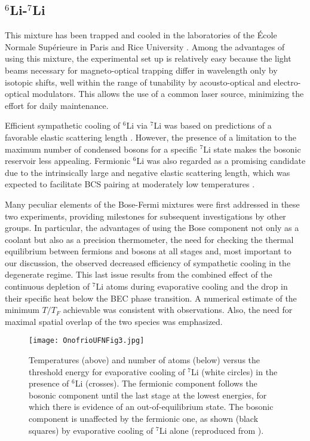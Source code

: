 \documentclass[pra,letterpaper,twocolumn,showpacs,superscriptaddress]{revtex4}
\begin{document}
\subsection{\bf{${}^6$Li-${}^{7}$Li}}

This mixture has been trapped and cooled in the laboratories of the \'Ecole Normale Sup\'erieure in Paris \cite{Schreck2001a,Schreck2001b} and 
Rice University \cite{Truscott2001}. Among the advantages of using this mixture, the experimental set up is relatively easy because  
the light beams necessary for magneto-optical trapping differ in wavelength only by isotopic shifts, well within the range of tunability 
by acousto-optical and electro-optical modulators. This allows the use of a common laser source, minimizing the effort for daily maintenance. 

Efficient sympathetic cooling of ${}^6$Li via ${}^7$Li was based on predictions of a favorable elastic scattering length 
\cite{VanAbeleen1997}. However, the presence of a limitation to the maximum number of condensed bosons for a specific ${}^7$Li state
makes the bosonic reservoir less appealing. Fermionic ${}^6$Li was also regarded as a promising candidate due to the intrinsically large and 
negative elastic scattering length, which was expected to facilitate BCS pairing at moderately low temperatures \cite{Combescot1999}. 

Many peculiar elements of the Bose-Fermi mixtures were first addressed in these two experiments, providing milestones for subsequent 
investigations by other groups. In particular, the advantages of using the Bose component not only as a coolant but also as a 
precision thermometer, the need for checking the thermal equilibrium between fermions and bosons at all stages  and, most important to 
our discussion, the observed decreased efficiency of sympathetic cooling in the degenerate regime. This last issue results from the 
combined effect of the continuous depletion of ${}^7$Li atoms during evaporative cooling and the drop in their specific
heat below the BEC phase transition. A numerical estimate of the minimum $T/T_F$ achievable was consistent with observations. 
Also, the need for maximal spatial overlap of the two species was emphasized. 

\begin{figure}[b]
\begin{center}
\texttt{[image: OnofrioUFNFig3.jpg]}
\caption{Temperatures (above) and number of atoms (below) versus the threshold energy 
for evaporative cooling of ${}^{7}$Li (white circles) in the presence of ${}^6$Li (crosses). 
The fermionic component follows the bosonic component until the last stage at the lowest 
energies, for which there is evidence of an out-of-equilibrium state. The bosonic 
component is unaffected by the fermionic one, as shown (black squares) by evaporative cooling of 
${}^{7}$Li alone (reproduced from \cite{Schreck2001a}).}
\label{}
\end{center}
\end{figure}
\end{document}
